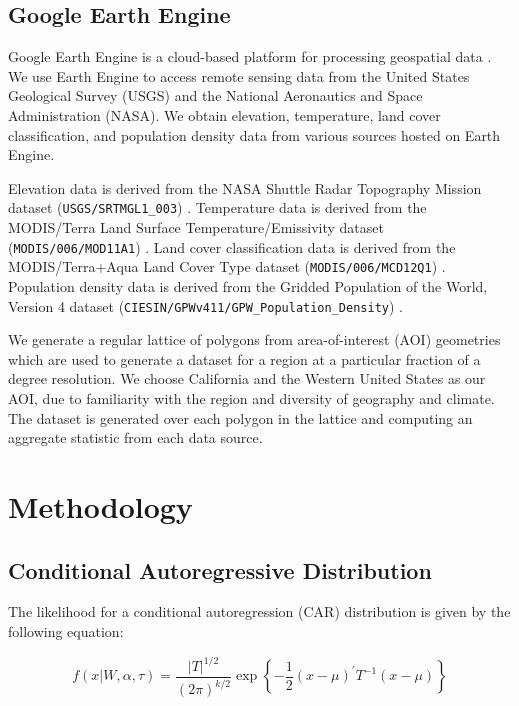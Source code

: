 \documentclass[notitlepage]{article}
\begin{document}
\subsection{Google Earth Engine}

Google Earth Engine is a cloud-based platform for processing geospatial data \cite{gorelick_google_2017}.
We use Earth Engine to access remote sensing data from the United States Geological Survey (USGS) and the National Aeronautics and Space Administration (NASA).
We obtain elevation, temperature, land cover classification, and population density data from various sources hosted on Earth Engine.

Elevation data is derived from the NASA Shuttle Radar Topography Mission dataset (\texttt{USGS/SRTMGL1\_003}) \cite{nasa_srtmg}.
Temperature data is derived from the MODIS/Terra Land Surface Temperature/Emissivity dataset (\texttt{MODIS/006/MOD11A1}) \cite{wan_zhengming_mod11a1_2015}.
Land cover classification data is derived from the MODIS/Terra+Aqua Land Cover Type dataset (\texttt{MODIS/006/MCD12Q1}) \cite{friedl_mark_mcd12q1_2019}.
Population density data is derived from the Gridded Population of the World, Version 4 dataset (\texttt{CIESIN/GPWv411/GPW\_Population\_Density}) \cite{gpwv4}.

We generate a regular lattice of polygons from area-of-interest (AOI) geometries which are used to generate a dataset for a region at a particular fraction of a degree resolution.
We choose California and the Western United States as our AOI, due to familiarity with the region and diversity of geography and climate.
The dataset is generated over each polygon in the lattice and computing an aggregate statistic from each data source.

\section{Methodology}

\subsection{Conditional Autoregressive Distribution}

The likelihood for a conditional autoregression (CAR) distribution is given by the following equation:

\begin{equation}
f(x|W, \alpha, \tau) =
    \frac{|T|^{1/2}}{(2\pi)^{k/2}}
    \exp \left\{
        -\frac{1}{2} (x - \mu)^\prime T^{-1} (x - \mu)
    \right\}
\end{equation}
\end{document}
